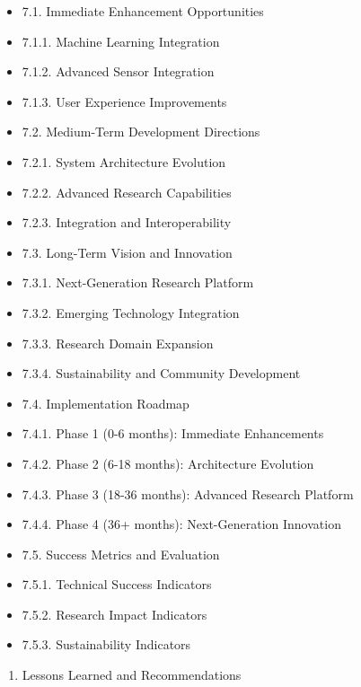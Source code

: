 \documentclass[11pt,a4paper]{report}
\begin{document}
\begin{itemize}
\item 7.1. Immediate Enhancement Opportunities
\item 7.1.1. Machine Learning Integration
\item 7.1.2. Advanced Sensor Integration
\item 7.1.3. User Experience Improvements
\item 7.2. Medium-Term Development Directions
\item 7.2.1. System Architecture Evolution
\item 7.2.2. Advanced Research Capabilities
\item 7.2.3. Integration and Interoperability
\item 7.3. Long-Term Vision and Innovation
\item 7.3.1. Next-Generation Research Platform
\item 7.3.2. Emerging Technology Integration
\item 7.3.3. Research Domain Expansion
\item 7.3.4. Sustainability and Community Development
\item 7.4. Implementation Roadmap
\item 7.4.1. Phase 1 (0-6 months): Immediate Enhancements
\item 7.4.2. Phase 2 (6-18 months): Architecture Evolution
\item 7.4.3. Phase 3 (18-36 months): Advanced Research Platform
\item 7.4.4. Phase 4 (36+ months): Next-Generation Innovation
\item 7.5. Success Metrics and Evaluation
\item 7.5.1. Technical Success Indicators
\item 7.5.2. Research Impact Indicators
\item 7.5.3. Sustainability Indicators
\end{itemize}
\begin{enumerate}
\item Lessons Learned and Recommendations
\end{enumerate}
\end{document}
